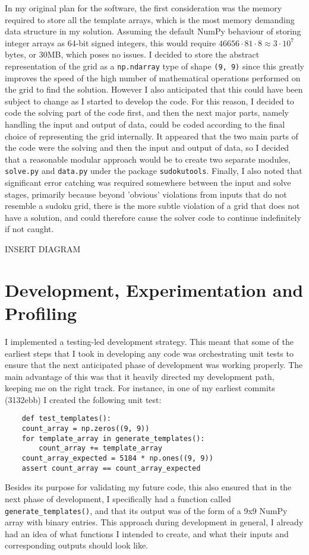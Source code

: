 \documentclass[12pt]{article}
\begin{document}
In my original plan for the software, the first consideration was the memory required to store all the template arrays, which is the most memory demanding data structure in my solution.
Assuming the default NumPy behaviour of storing integer arrays as 64-bit signed integers, this would require $46656\cdot81\cdot8\approx3\cdot10^7$ bytes, or 30MB, which poses no issues.
I decided to store the abstract representation of the grid as a \texttt{np.ndarray} type of shape \texttt{(9, 9)} since this greatly improves the speed of the high number of mathematical operations performed on the grid to find the solution.
However I also anticipated that this could have been subject to change as I started to develop the code.
For this reason, I decided to code the solving part of the code first, and then the next major parts, namely handling the input and output of data, could be coded according to the final choice of representing the grid internally.
It appeared that the two main parts of the code were the solving and then the input and output of data, so I decided that a reasonable modular approach would be to create two separate modules, \texttt{solve.py} and \texttt{data.py} under the package \texttt{sudokutools}.
Finally, I also noted that significant error catching was required somewhere between the input and solve stages, primarily because beyond 'obvious' violations from inputs that do not resemble a sudoku grid, there is the more subtle violation of a grid that does not have a solution, and could therefore cause the solver code to continue indefinitely if not caught.


INSERT DIAGRAM
\section*{Development, Experimentation and Profiling}
I implemented a testing-led development strategy.
This meant that some of the earliest steps that I took in developing any code was orchestrating unit tests to ensure that the next anticipated phase of development was working properly.
The main advantage of this was that it heavily directed my development path, keeping me on the right track.
For instance, in one of my earliest commits (3132ebb) I created the following unit test:

\begin{lstlisting}
    def test_templates():
    count_array = np.zeros((9, 9))
    for template_array in generate_templates():
        count_array += template_array
    count_array_expected = 5184 * np.ones((9, 9))
    assert count_array == count_array_expected
\end{lstlisting}
Besides its purpose for validating my future code, this also ensured that in the next phase of development, I specifically had a function called \texttt{generate\_templates()}, and that its output was of the form of a 9x9 NumPy array with binary entries.
This approach during development in general, I already had an idea of what functions I intended to create, and what their inputs and corresponding outputs should look like.
\end{document}
